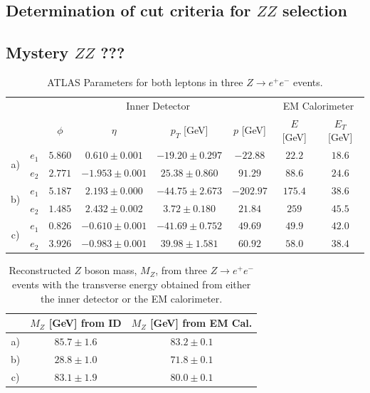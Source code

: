 \documentclass[twoside,        %
               BCOR12mm,       %
               ngerman,english, %
               fleqn,headsepline=false,footsepline=false
              ]{Vorlage/MFPREPORT}
\begin{document}
\subsection{Determination of cut criteria for $ZZ$ selection}

\subsection{Mystery $ZZ$ ???}


\begin{table}
\centering
\begin{tabular}{|c c|c|c|c|c|c|c|}
\hline
& & \multicolumn{4}{c|}{Inner Detector}&\multicolumn{2}{c|}{EM
Calorimeter}\\
& &$\phi$&$\eta$&$p_T$ [GeV]&$p$ [GeV]&$E$ [GeV]&$E_T$
[GeV]\\
\hline
\multirow{2}{*}{a)}&$e_1$&$5.860$&$0.610\pm
0.001$&$-19.20\pm 0.297$&$-22.88$&$22.2$&$18.6$\\
&$e_2$&$2.771$&$-1.953\pm 0.001$&$25.38\pm
0.860$&$91.29$&$88.6$&$24.6$\\
\hline
\multirow{2}{*}{b)}&$e_1$&$5.187$&$2.193\pm
0.000$&$-44.75\pm 2.673$&$-202.97$&$175.4$&$38.6$\\
&$e_2$&$1.485$&$2.432\pm 0.002$&$3.72\pm
0.180$&$21.84$&$259$&$45.5$\\
\hline
\multirow{2}{*}{c)}&$e_1$&$0.826$&$-0.610\pm
0.001$&$-41.69\pm
0.752$&$49.69$&$49.9$&$42.0$\\
&$e_2$&$3.926$&$-0.983\pm 0.001$&$39.98\pm
1.581$&$60.92$&$58.0$&$38.4$\\
\hline
\end{tabular}
\caption{ATLAS Parameters for both
leptons in three $Z\rightarrow e^+
e^-$ events.}
\label{tab:zrec}
\end{table}




\begin{table}
\centering
\begin{tabular}{|c|c|c|}
\hline
& $M_Z$ [GeV] from ID&
$M_Z$ [GeV] from EM
Cal.\\
\hline
a)&$85.7\pm
1.6$&$83.2\pm
0.1$\\
\hline
b)&$28.8\pm
1.0$&$71.8\pm
0.1$\\
  \hline
    c)&
    $83.1\pm
    1.9$&$80.0\pm
    0.1$\\
      \hline
        \end{tabular}
          \caption{Reconstructed
          $Z$
          boson
          mass,
          $M_Z$,
          from
          three
          $Z\rightarrow
          e^+e^-$
          events
          with
          the
          transverse
          energy
          obtained
          from
          either
          the
          inner
          detector
          or
          the
          EM
          calorimeter.}
            \label{tab:zres}
        \end{table}
\end{document}
